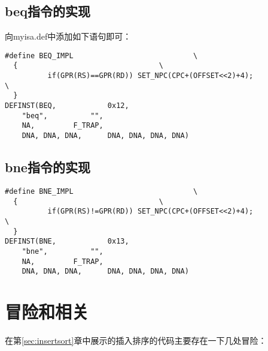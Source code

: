 \documentclass[a4paper,dvipdfm]{ctexart}
\begin{document}
\subsection{beq指令的实现}
\label{sec:beqimple}

向myisa.def中添加如下语句即可：

\begin{lstlisting}
#define BEQ_IMPL							\
  {									\
          if(GPR(RS)==GPR(RD)) SET_NPC(CPC+(OFFSET<<2)+4);              \
  }
DEFINST(BEQ,			0x12,
	"beq",			"",
	NA,			F_TRAP,
	DNA, DNA, DNA,		DNA, DNA, DNA, DNA)
\end{lstlisting}

\subsection{bne指令的实现}
\label{sec:bneimple}

\begin{lstlisting}
#define BNE_IMPL							\
  {									\
          if(GPR(RS)!=GPR(RD)) SET_NPC(CPC+(OFFSET<<2)+4);              \
  }
DEFINST(BNE,			0x13,
	"bne",			"",
	NA,			F_TRAP,
	DNA, DNA, DNA,		DNA, DNA, DNA, DNA)
\end{lstlisting}

\section{冒险和相关}

在第\ref{sec:insertsort}章中展示的插入排序的代码主要存在一下几处冒险：
\end{document}
